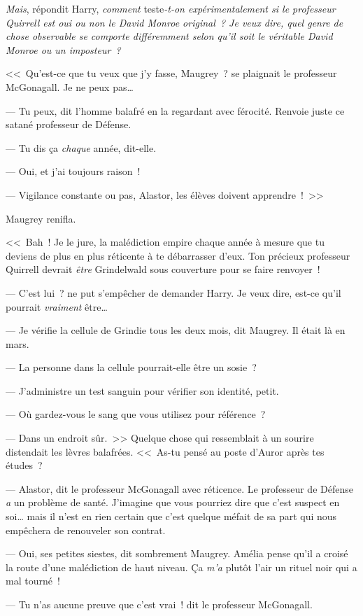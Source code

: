 \emph{Mais}, répondit Harry, \emph{comment} teste\emph{-t-on expérimentalement si le professeur Quirrell est oui ou non le David Monroe original~? Je veux dire, quel genre de chose observable se comporte différemment selon qu'il soit le véritable David Monroe ou un imposteur~?}

<<~Qu'est-ce que tu veux que j'y fasse, Maugrey~? se plaignait le professeur McGonagall. Je ne peux pas…

--- Tu peux, dit l'homme balafré en la regardant avec férocité. Renvoie juste ce satané professeur de Défense.

--- Tu dis ça \emph{chaque} année, dit-elle.

--- Oui, et j'ai toujours raison~!

--- Vigilance constante ou pas, Alastor, les élèves doivent apprendre~!~>>

Maugrey renifla.

<<~Bah~! Je le jure, la malédiction empire chaque année à mesure que tu deviens de plus en plus réticente à te débarrasser d'eux. Ton précieux professeur Quirrell devrait \emph{être} Grindelwald sous couverture pour se faire renvoyer~!

--- C'est lui~? ne put s'empêcher de demander Harry. Je veux dire, est-ce qu'il pourrait \emph{vraiment} être…

--- Je vérifie la cellule de Grindie tous les deux mois, dit Maugrey. Il était là en mars.

--- La personne dans la cellule pourrait-elle être un sosie~?

--- J'administre un test sanguin pour vérifier son identité, petit.

--- Où gardez-vous le sang que vous utilisez pour référence~?

--- Dans un endroit sûr.~>> Quelque chose qui ressemblait à un sourire distendait les lèvres balafrées. <<~As-tu pensé au poste d'Auror après tes études~?

--- Alastor, dit le professeur McGonagall avec réticence. Le professeur de Défense \emph{a} un problème de santé. J'imagine que vous pourriez dire que c'est suspect en soi… mais il n'est en rien certain que c'est quelque méfait de sa part qui nous empêchera de renouveler son contrat.

--- Oui, ses petites siestes, dit sombrement Maugrey. Amélia pense qu'il a croisé la route d'une malédiction de haut niveau. Ça \emph{m'a} plutôt l'air un rituel noir qui a mal tourné~!

--- Tu n'as aucune preuve que c'est vrai~! dit le professeur McGonagall.

